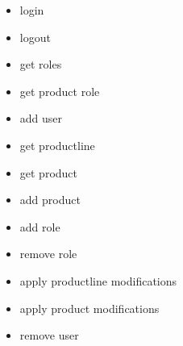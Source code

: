 \begin{itemize}
	\item login
	\item logout
	\item get roles
	\item get product role
	\item add user
	\item get productline
	\item get product
	\item add product
	\item add role
	\item remove role
	\item apply productline modifications
	\item apply product modifications
	\item remove user
\end{itemize}